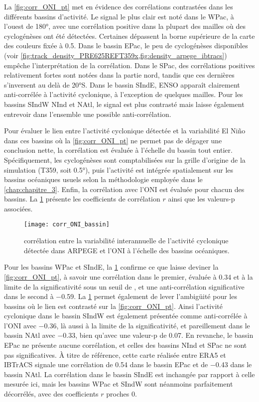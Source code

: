 \documentclass[../main.tex]{subfiles}
\begin{document}
La \cref{fig:corr_ONI_pt} met en évidence des corrélations contrastées dans les différents bassins d'activité. Le signal le plus clair est noté dans le WPac, à
l'ouest de \ang{180}, avec une corrélation positive dans la plupart des mailles où des cyclogénèses ont été détectées. Certaines dépassent la borne supérieure
de la carte des couleurs fixée à \num{0.5}. Dans le bassin EPac, le peu de cyclogénèses disponibles (voir
\cref{fig:track_density_PRE625REFT359x,fig:density_arpege_ibtracs}) empêche l'interprétation de la corrélation. Dans le SPac, des corrélations positives
relativement fortes sont notées dans la partie nord, tandis que ces dernières s'inversent au delà de \ang{20}S. Dans le bassin SIndE, ENSO apparaît clairement
anti-corrélée à l'activité cyclonique, à l'exception de quelques mailles. Pour les bassins SIndW NInd et NAtl, le signal est plus contrasté mais laisse également
entrevoir dans l'ensemble une possible anti-corrélation.

Pour évaluer le lien entre l'activité cyclonique détectée et la variabilité El Niño dans ces bassins où la \cref{fig:corr_ONI_pt} ne permet pas de dégager une
conclusion nette, la corrélation est évaluée à l'échelle du bassin tout entier. Spécifiquement, les cyclogénèses sont comptabilisées sur la grille d'origine de
la simulation (T359, soit \ang{0.5}), puis l'activité est intégrée spatialement sur les bassins océaniques usuels selon la méthodologie employée dans le
\cref{chap:chapitre_3}. Enfin, la corrélation avec l'ONI est évaluée pour chacun des bassins. La \cref{fig:corr_ONI_bassin} présente les coefficients de
corrélation $r$ ainsi que les valeurs-p associées.

\begin{figure}[tpb]
    \centering
    \texttt{[image: corr\_ONI\_bassin]}
    \caption{corrélation entre la variabilité interannuelle de l'activité cyclonique détectée dans ARPEGE et l'ONI à l'échelle des bassins océaniques.}
    \label{fig:corr_ONI_bassin}
\end{figure}

Pour les bassins WPac et SIndE, la \cref{fig:corr_ONI_bassin} confirme ce que laisse deviner la \cref{fig:corr_ONI_pt}, à savoir une corrélation dans le
premier, évaluée à \num{0.34} et à la limite de la significativité sous un seuil de , et une anti-corrélation significative dans le second à
\num{-0.59}. La \cref{fig:corr_ONI_bassin} permet également de lever l'ambigüité pour les bassins où le lien est contrasté sur la \cref{fig:corr_ONI_pt}. Ainsi
l'activité cyclonique dans le bassin SIndW est également présentée comme anti-corrélée à l'ONI avec \num{-0.36}, là aussi à la limite de la significativité, et
pareillement dans le bassin NAtl avec \num{-0.33}, bien qu'avec une valeur-p de \num{0.07}. En revanche, le bassin EPac ne présente aucune corrélation, et
celles des bassins NInd et SPac ne sont pas significatives. À titre de référence, cette carte réalisée entre ERA5 et IBTrACS signale une corrélation de
\num{0.54} dans le bassin EPac et de \num{-0.43} dans le bassin NAtl. La corrélation dans le bassin SIndE est inchangée par rapport à celle mesurée ici, mais
les bassins WPac et SIndW sont néanmoins parfaitement décorrélés, avec des coefficients $r$ proches \num{0}.
\end{document}
